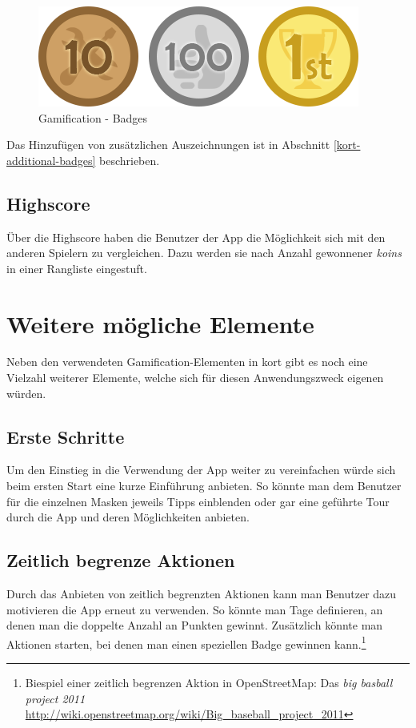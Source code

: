 \begin{figure}[H]
	\centering
	\includegraphics[scale=0.7]{images/gamification/gamification-badges}
	\caption{Gamification - Badges}
	\label{gamification-badges}
\end{figure}

Das Hinzufügen von zusätzlichen Auszeichnungen ist in Abschnitt \ref{kort-additional-badges} beschrieben.

\subsection{Highscore}
Über die Highscore haben die Benutzer der App die Möglichkeit sich mit den anderen Spielern zu vergleichen. Dazu werden sie nach Anzahl gewonnener \emph{koins} in einer Rangliste eingestuft.

\section{Weitere mögliche Elemente}
Neben den verwendeten Gamification-Elementen in kort gibt es noch eine Vielzahl weiterer Elemente, welche sich für diesen Anwendungszweck eigenen würden.

\subsection{Erste Schritte}
Um den Einstieg in die Verwendung der App weiter zu vereinfachen würde sich beim ersten Start eine kurze Einführung anbieten. So könnte man dem Benutzer für die einzelnen Masken jeweils Tipps einblenden oder gar eine geführte Tour durch die App und deren Möglichkeiten anbieten.

\subsection{Zeitlich begrenze Aktionen}
Durch das Anbieten von zeitlich begrenzten Aktionen kann man Benutzer dazu motivieren die App erneut zu verwenden.
So könnte man Tage definieren, an denen man die doppelte Anzahl an Punkten gewinnt.
Zusätzlich könnte man Aktionen starten, bei denen man einen speziellen Badge gewinnen kann.\footnote{Biespiel einer zeitlich begrenzen Aktion in OpenStreetMap: Das \emph{big basball project 2011} \url{http://wiki.openstreetmap.org/wiki/Big_baseball_project_2011}}

